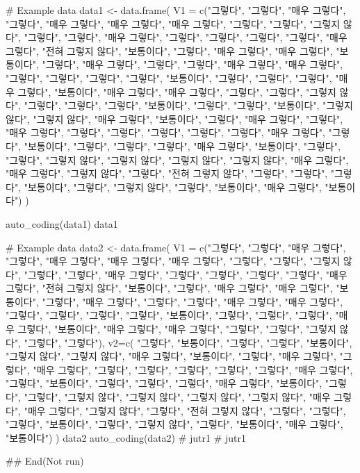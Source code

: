 \documentclass[a4paper]{book}
\begin{document}
\begin{Examples}
\begin{ExampleCode}
# Example data
data1 <- data.frame(
  V1 = c("그렇다", "그렇다", "매우 그렇다", "그렇다", "매우 그렇다",
         "매우 그렇다", "매우 그렇다", "그렇다", "그렇다", "그렇지 않다",
         "그렇다", "그렇다", "매우 그렇다", "그렇다", "그렇다",
         "그렇다", "그렇다", "매우 그렇다",  "전혀 그렇지 않다", "보통이다",
         "그렇다", "매우 그렇다", "매우 그렇다", "보통이다", "그렇다",
         "매우 그렇다", "그렇다", "그렇다", "매우 그렇다",   "매우 그렇다",
         "그렇다", "그렇다", "그렇다", "그렇다", "보통이다",
         "그렇다", "그렇다", "그렇다", "매우 그렇다", "보통이다",
         "매우 그렇다", "매우 그렇다", "그렇다", "그렇다", "그렇지 않다",
         "그렇다", "그렇다",
         "그렇다", "보통이다", "그렇다", "그렇다", "보통이다", "그렇지 않다",
         "그렇지 않다", "매우 그렇다", "보통이다", "그렇다", "매우 그렇다",
         "그렇다", "매우 그렇다", "그렇다", "그렇다", "그렇다", "그렇다",
         "그렇다", "매우 그렇다", "그렇다", "보통이다", "그렇다", "그렇다",
         "그렇다", "매우 그렇다", "보통이다", "그렇다", "그렇다", "그렇지 않다",
         "그렇지 않다", "그렇지 않다", "그렇지 않다", "매우 그렇다", "매우 그렇다",
         "그렇지 않다", "그렇다", "전혀 그렇지 않다", "그렇다", "그렇다",
         "그렇다", "보통이다", "그렇다", "그렇지 않다", "그렇다", "보통이다",
         "매우 그렇다", "보통이다")
)

auto_coding(data1)
data1

# Example data
data2 <- data.frame(
  V1 = c("그렇다", "그렇다", "매우 그렇다", "그렇다", "매우 그렇다",
         "매우 그렇다", "매우 그렇다", "그렇다", "그렇다", "그렇지 않다",
         "그렇다", "그렇다", "매우 그렇다", "그렇다", "그렇다",
         "그렇다", "그렇다", "매우 그렇다",  "전혀 그렇지 않다", "보통이다",
         "그렇다", "매우 그렇다", "매우 그렇다", "보통이다", "그렇다",
         "매우 그렇다", "그렇다", "그렇다", "매우 그렇다",   "매우 그렇다",
         "그렇다", "그렇다", "그렇다", "그렇다", "보통이다",
         "그렇다", "그렇다", "그렇다", "매우 그렇다", "보통이다",
         "매우 그렇다", "매우 그렇다", "그렇다", "그렇다", "그렇지 않다",
         "그렇다", "그렇다"),
  v2=c( "그렇다", "보통이다", "그렇다", "그렇다", "보통이다", "그렇지 않다",
        "그렇지 않다", "매우 그렇다", "보통이다", "그렇다", "매우 그렇다",
        "그렇다", "매우 그렇다", "그렇다", "그렇다", "그렇다", "그렇다",
        "그렇다", "매우 그렇다", "그렇다", "보통이다", "그렇다", "그렇다",
        "그렇다", "매우 그렇다", "보통이다", "그렇다", "그렇다", "그렇지 않다",
        "그렇지 않다", "그렇지 않다", "그렇지 않다", "매우 그렇다", "매우 그렇다",
        "그렇지 않다", "그렇다", "전혀 그렇지 않다", "그렇다", "그렇다",
        "그렇다", "보통이다", "그렇다", "그렇지 않다", "그렇다", "보통이다",
        "매우 그렇다", "보통이다")
)
data2
auto_coding(data2)
# jutr1 %
# jutr1 %

## End(Not run)
\end{ExampleCode}
\end{Examples}
\end{document}
